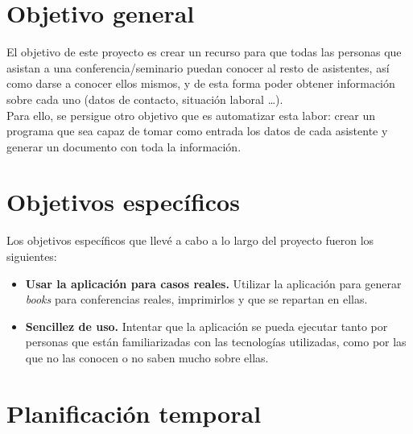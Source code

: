 \documentclass[a4paper, 12pt]{book}
\begin{document}
\section{Objetivo general} %
\label{sec:objetivo-general} %

El objetivo de este proyecto es crear un recurso para que todas las personas que asistan a una conferencia/seminario puedan conocer al resto de asistentes, así como darse a conocer ellos mismos, y de esta forma poder obtener información sobre cada uno (datos de contacto, situación laboral \ldots).\\

Para ello, se persigue otro objetivo que es automatizar esta labor: crear un programa que sea capaz de tomar como entrada los datos de cada asistente y generar un documento con toda la información.


\section{Objetivos específicos}
\label{sec:objetivos-especificos}

Los objetivos específicos que llevé a cabo a lo largo del proyecto fueron los siguientes:
\begin{itemize}
  \item \textbf{Usar la aplicación para casos reales.} Utilizar la aplicación para generar \textit{books} para conferencias reales, imprimirlos y que se repartan en ellas.
  \item \textbf{Sencillez de uso.} Intentar que la aplicación se pueda ejecutar tanto por personas que están familiarizadas con las tecnologías utilizadas, como por las que no las conocen o no saben mucho sobre ellas.
\end{itemize}

\section{Planificación temporal}
\label{sec:planificacion-temporal}
\end{document}
